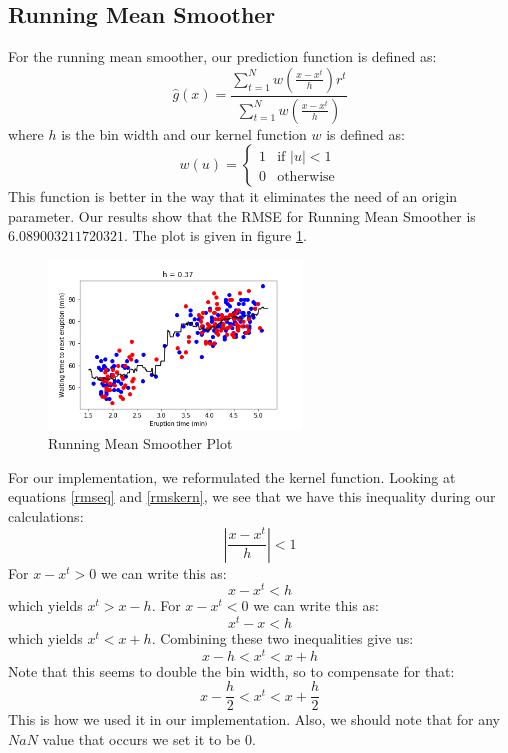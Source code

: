 \documentclass[11pt,reqno]{amsart}
\begin{document}
\subsection{Running Mean Smoother}
For the running mean smoother, our prediction function is defined as:
\begin{equation}
\label{rmseq}
\hat{g}(x) = \frac{\sum_{t=1}^Nw(\frac{x-x^t}{h})r^t}{\sum_{t=1}^Nw(\frac{x-x^t}{h})}
\end{equation}
where $h$ is the bin width and our kernel function $w$ is defined as:
\begin{equation}
\label{rmskern}
w(u) = 
	\begin{cases} 
      	1 & \text{if } |u| < 1\\
      	0 & \text{otherwise}
   	\end{cases}
\end{equation}
This function is better in the way that it eliminates the need of an origin parameter. Our results show that the RMSE for Running Mean Smoother is $6.089003211720321$. The plot is given in figure \ref{rmsfig}.
\begin{figure}[ht]
	\centering
	\caption{Running Mean Smoother Plot}
	\label{rmsfig}
	\begin{centering}
		\includegraphics[width=0.6\textwidth]{rms.png}
	\end{centering}
\end{figure}
For our implementation, we reformulated the kernel function. Looking at equations \eqref{rmseq} and \eqref{rmskern}, we see that we have this inequality during our calculations:
\begin{equation}
\left|\frac{x-x^t}{h}\right| < 1
\end{equation}
For $x-x^t > 0$ we can write this as:
\begin{equation}
x-x^t < h
\end{equation}
which yields $x^t > x - h$. For $x - x^t < 0$ we can write this as:
\begin{equation}
x^t-x < h
\end{equation}
which yields $x^t < x + h$. Combining these two inequalities give us:
\begin{equation}
x - h < x^t < x + h
\end{equation}
Note that this seems to double the bin width, so to compensate for that:
\begin{equation}
x - \frac{h}{2} < x^t < x + \frac{h}{2}
\end{equation}
This is how we used it in our implementation. Also, we should note that for any $NaN$ value that occurs we set it to be $0$.
\end{document}
